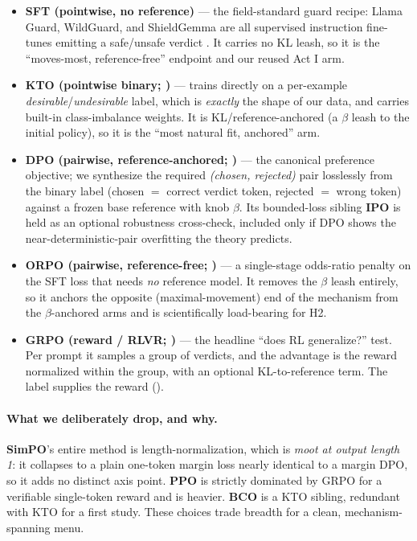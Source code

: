 \begin{itemize}[leftmargin=1.4em,itemsep=1pt]
  \item \textbf{SFT (pointwise, no reference)} --- the field-standard guard recipe: Llama Guard,
  WildGuard, and ShieldGemma are all supervised instruction fine-tunes emitting a safe/unsafe verdict
  \citep{inan2023llamaguard,han2024wildguard,zeng2024shieldgemma}. It carries no KL leash, so it is the
  ``moves-most, reference-free'' endpoint and our reused Act I arm.
  \item \textbf{KTO (pointwise binary; \citealp{ethayarajh2024kto})} --- trains directly on a per-example
  \emph{desirable}/\emph{undesirable} label, which is \emph{exactly} the shape of our data, and carries
  built-in class-imbalance weights. It is KL/reference-anchored (a $\beta$ leash to the initial policy),
  so it is the ``most natural fit, anchored'' arm.
  \item \textbf{DPO (pairwise, reference-anchored; \citealp{rafailov2023dpo})} --- the canonical preference
  objective; we synthesize the required \emph{(chosen, rejected)} pair losslessly from the binary label
  (chosen $=$ correct verdict token, rejected $=$ wrong token) against a frozen base reference with knob
  $\beta$. Its bounded-loss sibling \textbf{IPO} \citep{azar2023ipo} is held as an optional robustness
  cross-check, included only if DPO shows the near-deterministic-pair overfitting the theory predicts.
  \item \textbf{ORPO (pairwise, reference-free; \citealp{hong2024orpo})} --- a single-stage odds-ratio
  penalty on the SFT loss that needs \emph{no} reference model. It removes the $\beta$ leash entirely, so
  it anchors the opposite (maximal-movement) end of the mechanism from the $\beta$-anchored arms and is
  scientifically load-bearing for H2.
  \item \textbf{GRPO (reward / RLVR; \citealp{shao2024deepseekmath})} --- the headline ``does RL
  generalize?'' test. Per prompt it samples a group of verdicts, and the advantage is the reward
  normalized within the group, with an optional KL-to-reference term. The label supplies the reward
  ().
\end{itemize}

\paragraph{What we deliberately drop, and why.} \textbf{SimPO}'s entire method is length-normalization,
which is \emph{moot at output length 1}: it collapses to a plain one-token margin loss nearly identical to
a margin DPO, so it adds no distinct axis point. \textbf{PPO} \citep{schulman2017ppo} is strictly
dominated by GRPO for a verifiable single-token reward and is heavier. \textbf{BCO} is a KTO sibling,
redundant with KTO for a first study. These choices trade breadth for a clean, mechanism-spanning menu.


